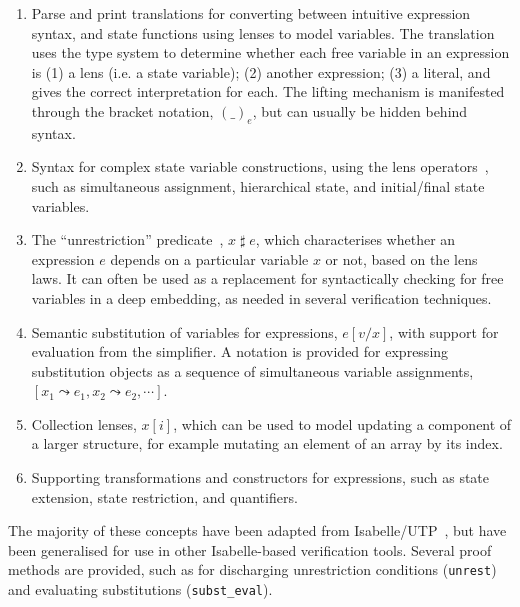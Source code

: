 \documentclass[11pt,a4paper]{article}
\begin{document}
\begin{enumerate}
  \item Parse and print translations for converting between intuitive expression syntax,
    and state functions using lenses to model variables. The translation uses the type
    system to determine whether each free variable in an expression is (1) a lens (i.e. a state 
    variable); (2) another expression; (3) a literal, and gives the correct interpretation for each.
    The lifting mechanism is manifested through the bracket notation, $(\_)_e$, but can usually be hidden behind syntax.
  \item Syntax for complex state variable constructions, using the lens operators~\cite{Optics-AFP}, such as simultaneous 
    assignment, hierarchical state, and initial/final state variables.
  \item The ``unrestriction'' predicate~\cite{Oliveira07}, $x \mathop{\sharp} e$, which characterises whether an expression $e$ depends on a
    particular variable $x$ or not, based on the lens laws. It can often be used as a replacement for 
    syntactically checking for free variables in a deep embedding, as needed in several verification
    techniques.
  \item Semantic substitution of variables for expressions, $e[v/x]$, with support for evaluation from 
    the simplifier. A notation is provided for expressing substitution objects as a sequence of simultaneous 
    variable assignments, $[x_1 \leadsto e_1, x_2 \leadsto e_2, \cdots]$.
  \item Collection lenses, $x[i]$, which can be used to model updating a component of a larger structure,
    for example mutating an element of an array by its index.
  \item Supporting transformations and constructors for expressions, such as state extension, 
    state restriction, and quantifiers.
\end{enumerate}

The majority of these concepts have been adapted from Isabelle/UTP~\cite{Foster2020-IsabelleUTP}, but 
have been generalised for use in other Isabelle-based verification tools. Several proof methods are 
provided, such as for discharging unrestriction conditions (\texttt{unrest}) and evaluating substitutions (\texttt{subst\_eval}).





\end{document}
